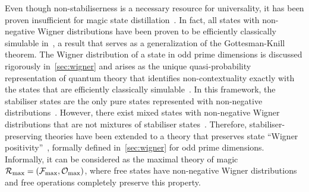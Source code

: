 \documentclass[pra,
aps,
twocolumn,
superscriptaddress,
groupedaddress,
nofootinbib,
reprint
]{revtex4-1}
\begin{document}
Even though non-stabiliserness is a necessary resource for universality, it has been proven insufficient for magic state distillation~\cite{cit:bravyi, cit:campbell}.
In fact, all states with non-negative Wigner distributions have been proven to be efficiently classically simulable in~\cite{cit:mari}, a result that serves as a generalization of the Gottesman-Knill theorem.
The Wigner distribution of a state in odd prime dimensions is discussed rigorously in~\cref{sec:wigner} and arises as the unique quasi-probability representation of quantum theory that identifies non-contextuality exactly with the states that are efficiently classically simulable~\cite{cit:howard2, cit:veitch2}.
In this framework, the stabiliser states are the only pure states represented with non-negative distributions~\cite{cit:gross3}. 
However, there exist mixed states with non-negative Wigner distributions that are not mixtures of stabiliser states~\cite{cit:gross}.
Therefore, stabiliser-preserving theories have been extended to a theory that preserves state ``Wigner positivity''~\cite{cit:wang}, formally defined in~\cref{sec:wigner} for odd prime dimensions.
Informally, it can be considered as the maximal theory of magic $\mathcal{R}_{\rm{max}} = (\mathcal{F}_{\rm{max}}, \mathcal{O}_{\rm{max}})$, where free states have non-negative Wigner distributions and free operations completely preserve this property.\\ 

\end{document}
